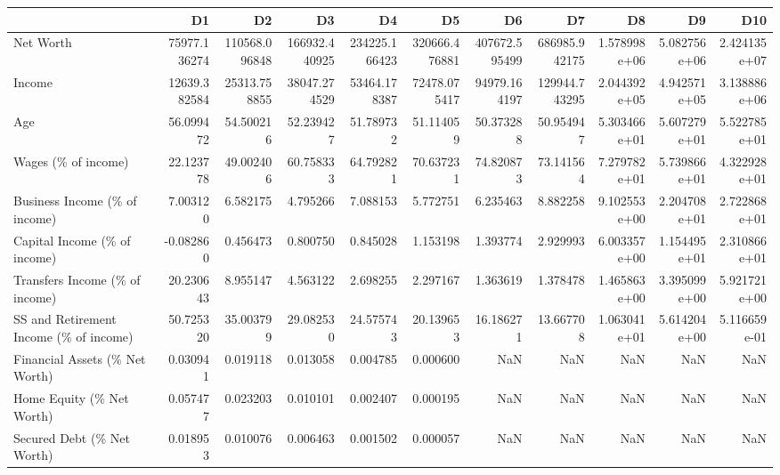 \begin{tabular}{lrrrrrrrrrr}
\toprule
{} &            D1 &             D2 &             D3 &             D4 &             D5 &             D6 &             D7 &            D8 &            D9 &           D10 \\
\midrule
Net Worth                              &  75977.136274 &  110568.096848 &  166932.440925 &  234225.166423 &  320666.476881 &  407672.595499 &  686985.942175 &  1.578998e+06 &  5.082756e+06 &  2.424135e+07 \\
Income                                 &  12639.382584 &   25313.758855 &   38047.274529 &   53464.178387 &   72478.075417 &   94979.164197 &  129944.743295 &  2.044392e+05 &  4.942571e+05 &  3.138886e+06 \\
Age                                    &     56.099472 &      54.500216 &      52.239427 &      51.789732 &      51.114059 &      50.373288 &      50.954947 &  5.303466e+01 &  5.607279e+01 &  5.522785e+01 \\
Wages (\% of income)                    &     22.123778 &      49.002406 &      60.758333 &      64.792821 &      70.637231 &      74.820873 &      73.141564 &  7.279782e+01 &  5.739866e+01 &  4.322928e+01 \\
Business Income (\% of income)          &      7.003120 &       6.582175 &       4.795266 &       7.088153 &       5.772751 &       6.235463 &       8.882258 &  9.102553e+00 &  2.204708e+01 &  2.722868e+01 \\
Capital Income (\% of income)           &     -0.082860 &       0.456473 &       0.800750 &       0.845028 &       1.153198 &       1.393774 &       2.929993 &  6.003357e+00 &  1.154495e+01 &  2.310866e+01 \\
Transfers Income (\% of income)         &     20.230643 &       8.955147 &       4.563122 &       2.698255 &       2.297167 &       1.363619 &       1.378478 &  1.465863e+00 &  3.395099e+00 &  5.921721e+00 \\
SS and Retirement Income (\% of income) &     50.725320 &      35.003799 &      29.082530 &      24.575743 &      20.139653 &      16.186271 &      13.667708 &  1.063041e+01 &  5.614204e+00 &  5.116659e-01 \\
Financial Assets (\% Net Worth)         &      0.030941 &       0.019118 &       0.013058 &       0.004785 &       0.000600 &            NaN &            NaN &           NaN &           NaN &           NaN \\
Home Equity (\% Net Worth)              &      0.057477 &       0.023203 &       0.010101 &       0.002407 &       0.000195 &            NaN &            NaN &           NaN &           NaN &           NaN \\
Secured Debt (\% Net Worth)             &      0.018953 &       0.010076 &       0.006463 &       0.001502 &       0.000057 &            NaN &            NaN &           NaN &           NaN &           NaN \\
\bottomrule
\end{tabular}
